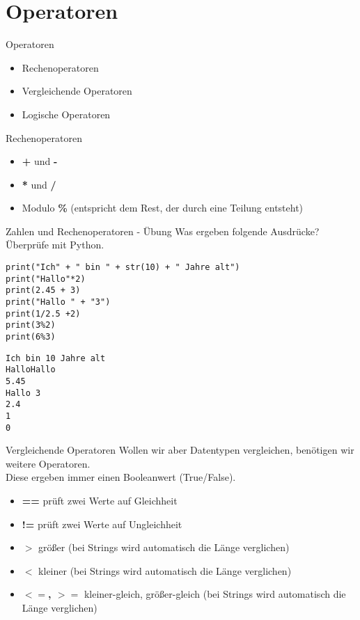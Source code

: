 \section{Operatoren}

\begin{frame}[fragile]{Operatoren}
\begin{itemize}
	\item Rechenoperatoren 
	\item Vergleichende Operatoren
	\item Logische Operatoren
\end{itemize}
\end{frame}

\begin{frame}[fragile]{Rechenoperatoren}
\begin{itemize}
\item \textbf{+} und \textbf{-}
\item \textbf{*} und \textbf{/}
\item Modulo \textbf{\%} (entspricht dem Rest, der durch eine Teilung entsteht)
\end{itemize}
\end{frame}


\begin{frame}[fragile]{Zahlen und Rechenoperatoren - Übung}
Was ergeben folgende Ausdrücke? Überprüfe mit  Python.
\begin{lstlisting}
print("Ich" + " bin " + str(10) + " Jahre alt") 
print("Hallo"*2)
print(2.45 + 3)
print("Hallo " + "3")
print(1/2.5 +2)
print(3%2)
print(6%3)
\end{lstlisting}
\pause{}
\begin{lstlisting}
Ich bin 10 Jahre alt
HalloHallo
5.45 
Hallo 3
2.4
1
0
\end{lstlisting}
\end{frame}



\begin{frame}[fragile]{Vergleichende Operatoren}
Wollen wir aber Datentypen vergleichen, benötigen wir weitere Operatoren.\\
Diese ergeben immer einen Booleanwert (True/False).\\

\begin{itemize}
\item \textbf{==} prüft zwei Werte auf Gleichheit
\item \textbf{!=} prüft zwei Werte auf Ungleichheit
\item \textbf{$>$} größer (bei Strings wird automatisch die Länge verglichen)
\item \textbf{$<$} kleiner (bei Strings wird automatisch die Länge verglichen)
\item \textbf{$<=$, $>=$}  kleiner-gleich, größer-gleich (bei Strings wird automatisch die Länge verglichen)

\end{itemize}
\end{frame}

